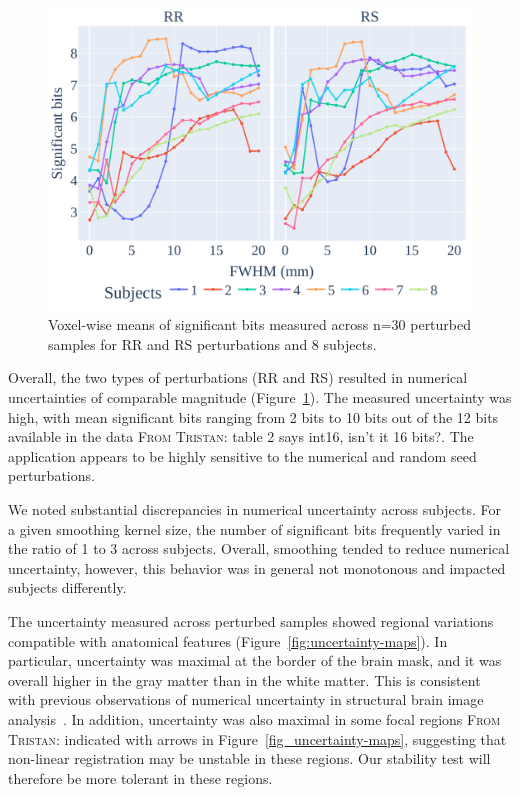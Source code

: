 \documentclass[lettersize,journal]{IEEEtran}
\newcommand{\TG}[1]{\color{blue}\textsc{From Tristan:} #1\color{black}\xspace}
\begin{document}
\begin{figure}
    \centering
    \includegraphics[width=\linewidth]{figures/stats.pdf}
    \caption{Voxel-wise means of significant bits
        measured across n=30 perturbed samples for RR and RS perturbations and 8
        subjects.}
    \label{fig:significant-digits}
\end{figure}
Overall, the two types of perturbations (RR and RS) resulted in numerical uncertainties of comparable magnitude (Figure~\ref{fig:significant-digits}). The measured uncertainty was high, with mean significant bits ranging from 2 bits to 10 bits out of the 12 bits available in the data \TG{table 2 says int16, isn't it 16 bits?}. The application appears to be highly sensitive to the numerical and random seed perturbations.

We noted substantial discrepancies in numerical uncertainty across subjects. For a given smoothing kernel size, the number of significant bits frequently varied in the ratio of 1 to 3 across subjects. Overall, smoothing tended to reduce numerical uncertainty, however, this behavior was in general not monotonous and impacted subjects differently.

The uncertainty measured across perturbed samples showed regional variations compatible with anatomical features (Figure~\ref{fig:uncertainty-maps}). In particular, uncertainty was
maximal at the border of the brain mask, and it was overall higher in the gray matter than in the white matter.
This is consistent with previous observations of numerical uncertainty in structural brain image analysis~\cite{salari2021accurate}.
In addition, uncertainty was also maximal in some focal regions \TG{indicated with arrows in Figure~\ref{fig_uncertainty-maps}}, suggesting that non-linear registration may be unstable in these regions. Our stability test will therefore be more tolerant in these regions.
\end{document}
